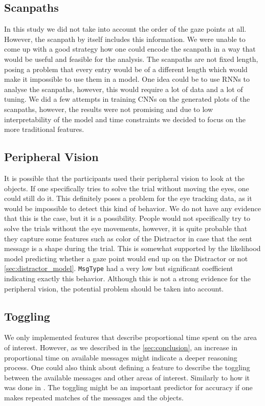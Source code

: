 \subsection{Scanpaths}
\label{sec:general-discussion:scanpaths}
In this study we did not take into account the order of the gaze points at all. However, the scanpath by itself includes this information. We were unable to come up with a good strategy how one could encode the scanpath in a way that would be useful and feasible for the analysis. The scanpaths are not fixed length, posing a problem that every entry would be of a different length which would make it impossible to use them in a model. One idea could be to use RNNs to analyse the scanpaths, however, this would require a lot of data and a lot of tuning. We did a few attempts in training CNNs on the generated plots of the scanpaths, however, the results were not promising and due to low interpretability of the model and time constraints we decided to focus on the more traditional features.

\subsection{Peripheral Vision}
\label{sec:general-discussion:attention-and-eye-tracking}
It is possible that the participants used their peripheral vision to look at the objects. If one specifically tries to solve the trial without moving the eyes, one could still do it. This definitely poses a problem for the eye tracking data, as it would be impossible to detect this kind of behavior. We do not have any evidence that this is the case, but it is a possibility. People would not specifically try to solve the trials without the eye movements, however, it is quite probable that they capture some features such as color of the Distractor in case that the sent message is a shape during the trial. This is somewhat supported by the likelihood model predicting whether a gaze point would end up on the Distractor or not \autoref{sec:distractor_model}. \texttt{MsgType} had a very low but significant coefficient indicating exactly this behavior. Although this is not a strong evidence for the peripheral vision, the potential problem should be taken into account.


\subsection{Toggling}
\label{sec:general-discussion:toggling}
We only implemented features that describe proportional time spent on the area of interest. However, as we described in the \autoref{sec:conclusion}, an increase in proportional time on available messages might indicate a deeper reasoning process. One could also think about defining a feature to describe the toggling between the available messages and other areas of interest. Similarly to how it was done in \cite{Vigneau_2006}. The toggling might be an important predictor for accuracy if one makes repeated matches of the messages and the objects. 

